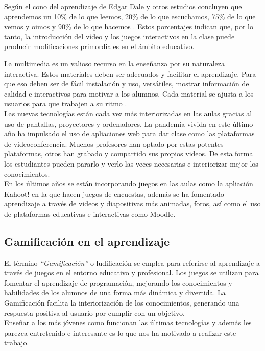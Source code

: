 Según el cono del aprendizaje de Edgar Dale y otros estudios concluyen que aprendemos un 10\% de lo que leemos, 20\% de lo que escuchamos, 75\% de lo que vemos y oimos y 
90\% de lo que hacemos \cite{videoeducativo}\cite{aprendizaje}. Estos porcentajes indican que, por lo tanto, la introducción del vídeo y los juegos interactivos en la clase puede producir modificaciones primordiales en el ámbito educativo.

La multimedia es un valioso recurso en la enseñanza por su naturaleza interactiva. Estos  materiales  deben ser adecuados y facilitar el aprendizaje. Para que eso deben ser de fácil instalación y uso, versátiles, mostrar información de calidad e interactivos para motivar a los alumnos. Cada material se ajusta a los usuarios para que trabajen a su ritmo \cite{importanciamultimedia}.
\\
Las nuevas tecnologías están cada vez más interiorizadas en las aulas gracias al uso de pantallas, proyectores y ordenadores. La pandemia vivida en este último año ha impulsado el uso de apliaciones web para dar clase como las plataformas de videoconferencia. Muchos profesores han optado por estas potentes plataformas, otros han grabado y compartido sus propios videos. De esta forma los estudiantes pueden pararlo y verlo las veces necesarias e interiorizar mejor los conocimientos.
\\
En los últimos años se están incorporando juegos en las aulas como la apliación Kahoot! \cite{kahoot} en la que hacen juegos de encuestas, además se ha fomentado aprendizaje a través de videos y diapositivas más animadas, foros, así como el uso de plataformas educativas e interactivas como Moodle.
\\

\subsection{Gamificación en el aprendizaje} \label{gamificacion}
 El término \textit{``Gamificación''} o ludificación se emplea para referirse al aprendizaje a través de juegos en el entorno educativo y profesional. Los juegos se utilizan para fomentar el aprendizaje de programación, mejorando los conocimientos y habilidades de los alumnos de una forma más dinámica y divertida. La Gamificación facilita la interiorización de los conocimientos, generando una respuesta positiva al usuario por cumplir con un objetivo.
 \\
 Enseñar a los más jóvenes como funcionan las últimas tecnologías y además les parezca entretenido e interesante es lo que nos ha motivado a realizar este trabajo.
 
